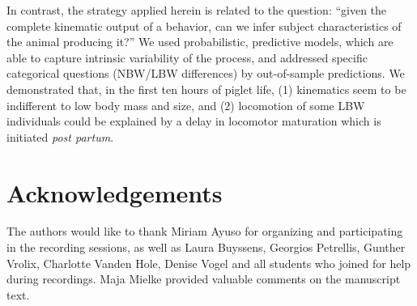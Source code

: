 \medskip
In contrast, the strategy applied herein is related to the question: ``given the complete kinematic output of a behavior, can we infer subject characteristics of the animal producing it?''
We used probabilistic, predictive models, which are able to capture intrinsic variability of the process, and addressed specific categorical questions (NBW/LBW differences) by out-of-sample predictions.
We demonstrated that, in the first ten hours of piglet life, (1) kinematics seem to be indifferent to low body mass and size, and (2) locomotion of some LBW individuals could be explained by a delay in locomotor maturation which is initiated \emph{post partum}.




\FloatBarrier
\clearpage
\section{Acknowledgements}
\label{sec:org2d8bfbc}
The authors would like to thank Miriam Ayuso for organizing and participating in the recording sessions, as well as Laura Buyssens, Georgios Petrellis, Gunther Vrolix, Charlotte Vanden Hole, Denise Vogel and all students who joined for help during recordings.
Maja Mielke provided valuable comments on the manuscript text.


\FloatBarrier
\clearpage
% 
% 
